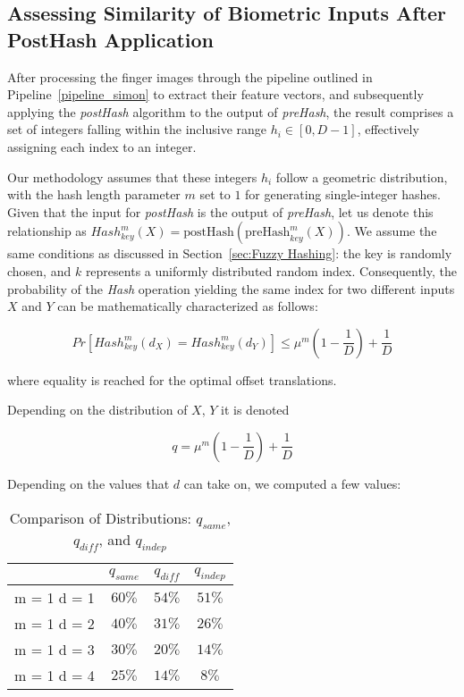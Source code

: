 \subsection{Assessing Similarity of Biometric Inputs After PostHash Application}
\label{sec:q}

After processing the finger images through the pipeline outlined in Pipeline~\ref{pipeline_simon} to extract their feature vectors, and subsequently applying the \textit{postHash} algorithm to the output of \textit{preHash}, the result comprises a set of integers falling within the inclusive range \(h_i \in [0, D-1]\), effectively assigning each index to an integer.

Our methodology assumes that these integers \(h_i\) follow a geometric distribution, with the hash length parameter \(m\) set to \(1\) for generating single-integer hashes. Given that the input for \textit{postHash} is the output of \textit{preHash}, let us denote this relationship as \(Hash_{key}^m(X) = \text{postHash}(\text{preHash}_{key}^m(X))\). We assume the same conditions as discussed in Section~\ref{sec:Fuzzy Hashing}: the key is randomly chosen, and \(k\) represents a uniformly distributed random index. Consequently, the probability of the \textit{Hash} operation yielding the same index for two different inputs \(X\) and \(Y\) can be mathematically characterized as follows:

\[Pr[Hash_{key}^m(d_X) = Hash_{key}^m(d_Y)] \leq \mu^m(1 - \frac{1}{D}) + \frac{1}{D}\]

where equality is reached for the optimal offset translations. 

Depending on the distribution of \(X\), \(Y\) it is denoted

\[q = \mu^m(1 - \frac{1}{D}) + \frac{1}{D}\]

Depending on the values that \(d\) can take on, we computed a few values:
\begin{table}[H]
    \centering
    \renewcommand{\arraystretch}{1.25}\begin{tabular}{|c|c|c|c|}
        \hline
        & $q_{same}$ & $q_{diff}$ & $q_{indep}$\\
        \hline
        m = 1 d = 1 & $60\%$ & $54\%$ & $51\%$\\
        m = 1 d = 2 & $40\%$ & $31\%$ & $26\%$\\
        m = 1 d = 3 & $30\%$ & $20\%$ & $14\%$\\
        m = 1 d = 4 & $25\%$ & $14\%$ & $8\%$\\
        \hline
    \end{tabular}
\caption{Comparison of Distributions: $q_{same}$, $q_{diff}$, and $q_{indep}$}
\end{table}


